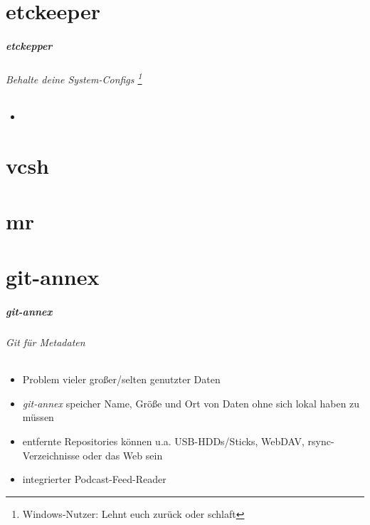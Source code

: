 \documentclass[ngerman,hyperref={pdfpagelabels=false}]{beamer}
\begin{document}
\part{etckeeper}
\makepart

\begin{frame}[label=etckeeper]
  \frametitle{etckepper}
  \framesubtitle{Behalte deine System-Configs \footnote{\tiny Windows-Nutzer: Lehnt euch zurück oder schlaft}}
  \begin{itemize}
    \item 
  \end{itemize}
\end{frame}


\part{vcsh}
\makepart

\begin{frame}[label=vcsh]
  \frametitle{}
  \framesubtitle{}
  
\end{frame}


\part{mr}
\makepart

\begin{frame}[label=mr]
  \frametitle{}
  \framesubtitle{}
  
\end{frame}


\part{git-annex}
\makepart

\begin{frame}[label=gitannex]
  \frametitle{git-annex}
  \framesubtitle{Git für Metadaten}
  \begin{itemize}
    \item Problem vieler großer/selten genutzter Daten
    \item \textit{git-annex} speicher Name, Größe und Ort von Daten ohne sich lokal haben zu müssen
    \item entfernte Repositories können u.a. USB-HDDs/Sticks, WebDAV, rsync-Verzeichnisse oder das Web sein
    \item integrierter Podcast-Feed-Reader
  \end{itemize}
\end{frame}
\end{document}
